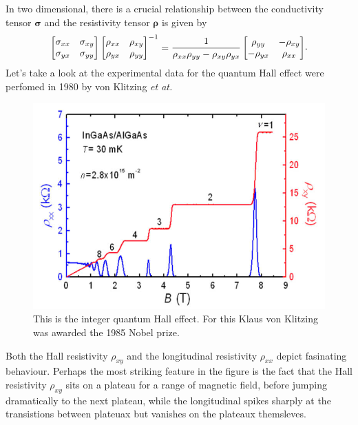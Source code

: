 In two dimensional, there is a crucial relationship between the conductivity tensor $\boldsymbol{\sigma}$ and the resistivity tensor $\boldsymbol{\rho}$ is given by
\begin{equation}
	\begin{aligned}
		\begin{bmatrix}
			\sigma_{xx} & \sigma_{xy} \\
			\sigma_{yx} & \sigma_{yy}
		\end{bmatrix}
		\begin{bmatrix}
			\rho_{xx} & \rho_{xy} \\
			\rho_{yx} & \rho_{yy}
		\end{bmatrix}^{-1}
		=
		\dfrac{1}{\rho_{xx} \rho_{yy} - \rho_{xy} \rho_{yx}}
		\begin{bmatrix}
			\rho_{yy}  & -\rho_{xy} \\
			-\rho_{yx} & \rho_{xx}
		\end{bmatrix}
	\end{aligned}.
\end{equation}
Let's take a look at the experimental data for the quantum Hall effect were perfomed in 1980 by von Klitzing \textit{et at.} \cite{klitzing90}
\begin{figure}[H]
	\centering
	\includegraphics[width=0.7\linewidth]{pic/quantumhall.jpg}
	\caption[Quantum Hall effect by von Klitzing.]{This is the integer quantum Hall effect. For this Klaus von Klitzing was awarded the 1985 Nobel prize.}
\end{figure}
\noindent Both the Hall resistivity $\rho_{xy}$ and the longitudinal resistivity $\rho_{xx}$ depict fasinating behaviour. Perhaps the most striking feature in the figure is the fact that the Hall resistivity $\rho_{xy}$ sits on a plateau for a range of magnetic field, before jumping dramatically to the next plateau, while the longitudinal spikes sharply at the transistions between plateuax but vanishes on the plateaux themsleves. 

